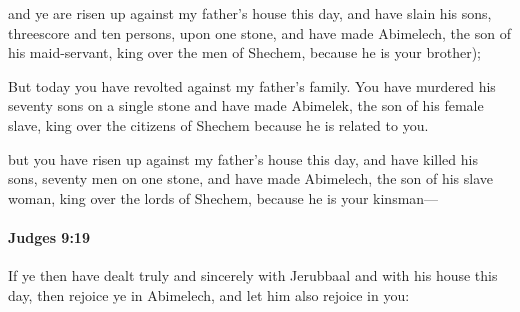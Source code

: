 			\begin{versebox}
					\item[BHS] 
					\item[ASV] and ye are risen up against my father's house this day, and have slain his sons, threescore and ten persons, upon one stone, and have made Abimelech, the son of his maid-servant, king over the men of Shechem, because he is your brother);
					\item[NIV] But today you have revolted against my father’s family. You have murdered his seventy sons on a single stone and have made Abimelek, the son of his female slave, king over the citizens of Shechem because he is related to you.
					\item[NRSV] but you have risen up against my father’s house this day, and have killed his sons, seventy men on one stone, and have made Abimelech, the son of his slave woman, king over the lords of Shechem, because he is your kinsman—
			\end{versebox}

		\paragraph{Judges 9:19} %
			\label{JUDGES-9-19}

			If ye then have dealt truly and sincerely with Jerubbaal and with his house this day, then rejoice ye in Abimelech, and let him also rejoice in you:

